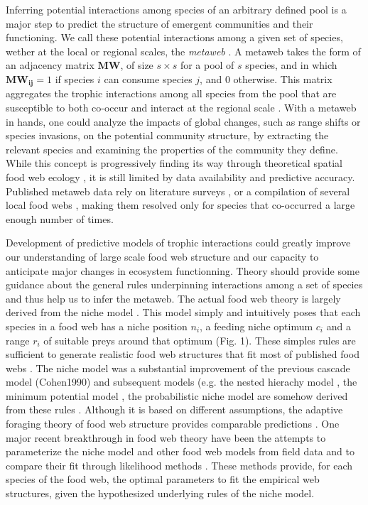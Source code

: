 \documentclass[12pt]{article}
\begin{document}
Inferring potential interactions among species of an arbitrary defined pool is a
major step to predict the structure of emergent communities and their
functioning. We call these potential interactions among a given set of species, wether
at the local or regional scales, the \emph{metaweb} \parencite{Dunne2006}. A
metaweb takes the form of an adjacency matrix $\mathbf{MW}$, of size $s\times s$
for a pool of $s$ species, and in which $\mathbf{MW_{ij}} = 1$ if species $i$
can consume species $j$, and $0$ otherwise. This matrix aggregates the trophic
interactions among all species from the pool that are susceptible to both
co-occur and interact at the regional scale \parencite{Dunne2006}. With a
metaweb in hands, one could analyze the impacts of global changes, such as range
shifts or species invasions, on the potential community structure, by extracting
the relevant species and examining the properties of the community they define.
While this concept is progressively finding its way through theoretical spatial
food web ecology \parencite{Lafferty2010, Pillai2009, Gravel2011a, Gravel2011b},
it is still limited by data availability and predictive accuracy. Published
metaweb data rely on literature surveys \parencite{Havens1992, Piechnik2008,
Baiser2012}, or a compilation of several local food webs \parencite{Stanko2002,
Poisot2012a}, making them resolved only for species that co-occurred a large
enough number of times.

Development of predictive models of trophic interactions could greatly improve
our understanding of large scale food web structure and our capacity to
anticipate major changes in ecosystem functionning. Theory should provide some
guidance about the general rules underpinning interactions among a set of
species and thus help us to infer the metaweb. The actual food web theory is
largely derived from the niche model \parencite{Williams2000}. This model simply
and intuitively poses that each species in a food web has a niche position
$n_i$, a feeding niche optimum $c_i$ and a range $r_i$ of suitable preys around
that optimum (Fig. 1). These simples rules are sufficient to generate realistic
food web structures that fit most of published food webs \parencite{Dunne2006}.
The niche model was a substantial improvement of the previous cascade model
(Cohen1990) and subsequent models (e.g. the nested hierachy model
\parencite{Cattin2004}, the minimum potential model \parencite{Allesina2008},
the probabilistic niche model \parencite{Williams2010} are somehow derived from
these rules \parencite{Stouffer2005}. Although it is based on different
assumptions, the adaptive foraging theory of food web structure
\parencite{Petchey2008b} provides comparable predictions
\parencite{Williams2010}. One major recent breakthrough in food web theory have
been the attempts to parameterize the niche model and other food web models from
field data and to compare their fit through likelihood methods
\parencite{Allesina2008, Williams2010, Williams2011}. These methods provide, for
each species of the food web, the optimal parameters to fit the empirical web
structures, given the hypothesized underlying rules of the niche model.
\end{document}
